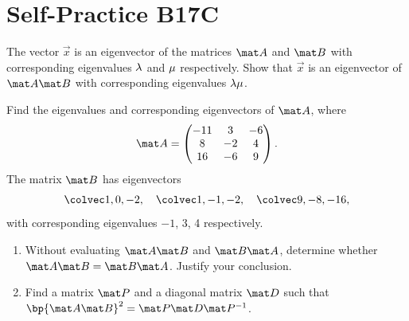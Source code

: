 \section{Self-Practice B17C}

\begin{problem}
    The vector $\vec x$ is an eigenvector of the matrices $\mat A$ and $\mat B$ with corresponding eigenvalues $\lambda$ and $\mu$ respectively. Show that $\vec x$ is an eigenvector of $\mat A \mat B$ with corresponding eigenvalues $\lambda \mu$.

    Find the eigenvalues and corresponding eigenvectors of $\mat A$, where \[\mat A = \begin{pmatrix}-11 & 3 & -6 \\ 8 & -2 & 4 \\ 16 & -6 & 9\end{pmatrix}.\] The matrix $\mat B$ has eigenvectors \[\cveciii10{-2}, \quad \cveciii1{-1}{-2}, \quad \cveciii9{-8}{-16},\] with corresponding eigenvalues $-1$, 3, 4 respectively.

    \begin{enumerate}
        \item Without evaluating $\mat A \mat B$ and $\mat B \mat A$, determine whether $\mat A \mat B = \mat B \mat A$. Justify your conclusion.
        \item Find a matrix $\mat P$ and a diagonal matrix $\mat D$ such that $\bp{\mat A \mat B}^2 = \mat P \mat D \mat P^{-1}$.
    \end{enumerate}
\end{problem}
